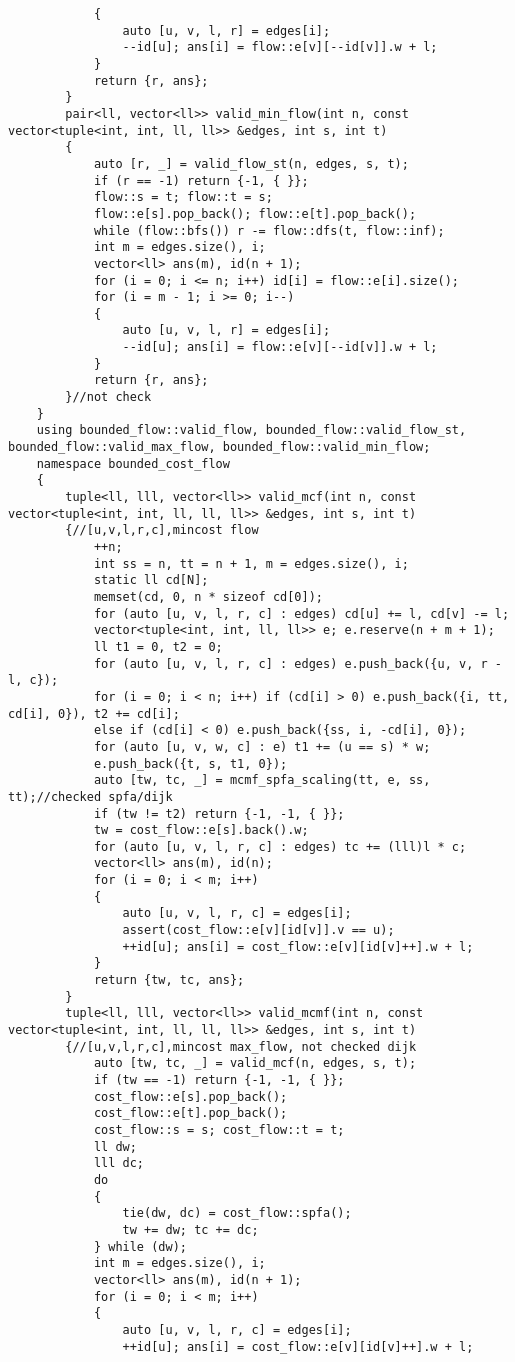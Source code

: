 \documentclass[12pt]{ctexart}
\begin{document}
\begin{lstlisting}
			{
				auto [u, v, l, r] = edges[i];
				--id[u]; ans[i] = flow::e[v][--id[v]].w + l;
			}
			return {r, ans};
		}
		pair<ll, vector<ll>> valid_min_flow(int n, const vector<tuple<int, int, ll, ll>> &edges, int s, int t)
		{
			auto [r, _] = valid_flow_st(n, edges, s, t);
			if (r == -1) return {-1, { }};
			flow::s = t; flow::t = s;
			flow::e[s].pop_back(); flow::e[t].pop_back();
			while (flow::bfs()) r -= flow::dfs(t, flow::inf);
			int m = edges.size(), i;
			vector<ll> ans(m), id(n + 1);
			for (i = 0; i <= n; i++) id[i] = flow::e[i].size();
			for (i = m - 1; i >= 0; i--)
			{
				auto [u, v, l, r] = edges[i];
				--id[u]; ans[i] = flow::e[v][--id[v]].w + l;
			}
			return {r, ans};
		}//not check
	}
	using bounded_flow::valid_flow, bounded_flow::valid_flow_st, bounded_flow::valid_max_flow, bounded_flow::valid_min_flow;
	namespace bounded_cost_flow
	{
		tuple<ll, lll, vector<ll>> valid_mcf(int n, const vector<tuple<int, int, ll, ll, ll>> &edges, int s, int t)
		{//[u,v,l,r,c],mincost flow
			++n;
			int ss = n, tt = n + 1, m = edges.size(), i;
			static ll cd[N];
			memset(cd, 0, n * sizeof cd[0]);
			for (auto [u, v, l, r, c] : edges) cd[u] += l, cd[v] -= l;
			vector<tuple<int, int, ll, ll>> e; e.reserve(n + m + 1);
			ll t1 = 0, t2 = 0;
			for (auto [u, v, l, r, c] : edges) e.push_back({u, v, r - l, c});
			for (i = 0; i < n; i++) if (cd[i] > 0) e.push_back({i, tt, cd[i], 0}), t2 += cd[i];
			else if (cd[i] < 0) e.push_back({ss, i, -cd[i], 0});
			for (auto [u, v, w, c] : e) t1 += (u == s) * w;
			e.push_back({t, s, t1, 0});
			auto [tw, tc, _] = mcmf_spfa_scaling(tt, e, ss, tt);//checked spfa/dijk
			if (tw != t2) return {-1, -1, { }};
			tw = cost_flow::e[s].back().w;
			for (auto [u, v, l, r, c] : edges) tc += (lll)l * c;
			vector<ll> ans(m), id(n);
			for (i = 0; i < m; i++)
			{
				auto [u, v, l, r, c] = edges[i];
				assert(cost_flow::e[v][id[v]].v == u);
				++id[u]; ans[i] = cost_flow::e[v][id[v]++].w + l;
			}
			return {tw, tc, ans};
		}
		tuple<ll, lll, vector<ll>> valid_mcmf(int n, const vector<tuple<int, int, ll, ll, ll>> &edges, int s, int t)
		{//[u,v,l,r,c],mincost max_flow, not checked dijk
			auto [tw, tc, _] = valid_mcf(n, edges, s, t);
			if (tw == -1) return {-1, -1, { }};
			cost_flow::e[s].pop_back();
			cost_flow::e[t].pop_back();
			cost_flow::s = s; cost_flow::t = t;
			ll dw;
			lll dc;
			do
			{
				tie(dw, dc) = cost_flow::spfa();
				tw += dw; tc += dc;
			} while (dw);
			int m = edges.size(), i;
			vector<ll> ans(m), id(n + 1);
			for (i = 0; i < m; i++)
			{
				auto [u, v, l, r, c] = edges[i];
				++id[u]; ans[i] = cost_flow::e[v][id[v]++].w + l;

\end{lstlisting}
\end{document}
